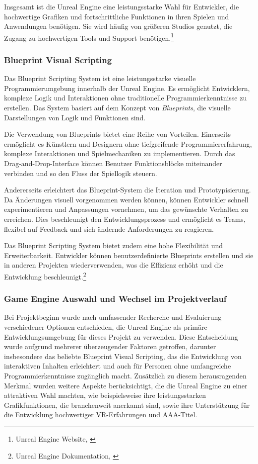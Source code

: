 Insgesamt ist die Unreal Engine eine leistungsstarke Wahl für Entwickler, die hochwertige Grafiken und fortschrittliche
Funktionen in ihren Spielen und Anwendungen benötigen. Sie wird häufig von größeren Studios genutzt, die Zugang zu hochwertigen
Tools und Support benötigen.\footnote{Unreal Engine Website, \cite{https://www.unrealengine.com/}}

\subsubsection*{Blueprint Visual Scripting}
Das Blueprint Scripting System ist eine leistungsstarke visuelle Programmierumgebung innerhalb der Unreal Engine. Es
ermöglicht Entwicklern, komplexe Logik und Interaktionen ohne traditionelle Programmierkenntnisse zu erstellen. Das System
basiert auf dem Konzept von \textit{Blueprints}, die visuelle Darstellungen von Logik und Funktionen sind.

Die Verwendung von Blueprints bietet eine Reihe von Vorteilen. Einerseits ermöglicht es Künstlern und Designern ohne
tiefgreifende Programmiererfahrung, komplexe Interaktionen und Spielmechaniken zu implementieren. Durch das Drag-and-Drop-Interface
können Benutzer Funktionsblöcke miteinander verbinden und so den Fluss der Spiellogik steuern.

Andererseits erleichtert das Blueprint-System die Iteration und Prototypisierung. Da Änderungen visuell vorgenommen
werden können, können Entwickler schnell experimentieren und Anpassungen vornehmen, um das gewünschte Verhalten zu erreichen.
Dies beschleunigt den Entwicklungsprozess und ermöglicht es Teams, flexibel auf Feedback und sich ändernde Anforderungen zu reagieren.

Das Blueprint Scripting System bietet zudem eine hohe Flexibilität und Erweiterbarkeit. Entwickler können benutzerdefinierte
Blueprints erstellen und sie in anderen Projekten wiederverwenden, was die Effizienz erhöht und die Entwicklung
beschleunigt.\footnote{Unreal Engine Dokumentation, \cite{Blueprint Visual Scripting}}

\subsubsection{Game Engine Auswahl und Wechsel im Projektverlauf}
Bei Projektbeginn wurde nach umfassender Recherche und Evaluierung verschiedener Optionen entschieden, die Unreal Engine
als primäre Entwicklungsumgebung für dieses Projekt zu verwenden. Diese Entscheidung wurde aufgrund mehrerer überzeugender
Faktoren getroffen, darunter insbesondere das beliebte Blueprint Visual Scripting, das die Entwicklung von interaktiven
Inhalten erleichtert und auch für Personen ohne umfangreiche Programmierkenntnisse zugänglich macht. Zusätzlich zu diesem
herausragenden Merkmal wurden weitere Aspekte berücksichtigt, die die Unreal Engine zu einer attraktiven Wahl machten,
wie beispielsweise ihre leistungsstarken Grafikfunktionen, die branchenweit anerkannt sind, sowie ihre Unterstützung für
die Entwicklung hochwertiger VR-Erfahrungen und AAA-Titel.

